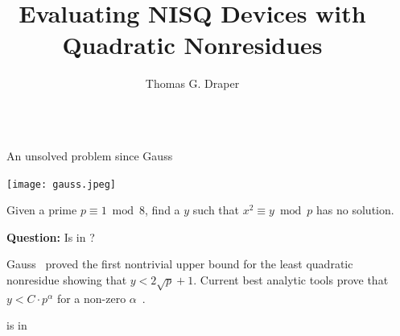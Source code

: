 \documentclass[final]{beamer}
\title{Evaluating NISQ Devices with Quadratic Nonresidues}
\author{Thomas G. Draper}
\institute[shortinst]{Center for Communications Research at La Jolla}
\providecommand{\QNR}{\csword{QNR}}
\newlength{\sepwidth}
\newlength{\colwidth}
\newcommand{\separatorcolumn}{\begin{column}{\sepwidth}\end{column}}
\begin{document}
\begin{frame}[t]

\begin{columns}[t]
\separatorcolumn

\begin{column}{\colwidth}

  \begin{block}{An unsolved problem since Gauss}
  \begin{minipage}[c]{0.3\colwidth}
    \texttt{[image: gauss.jpeg]}
  \end{minipage}
  \begin{minipage}[l]{0.7\colwidth}
    \bigskip

    Given a prime $p\equiv 1\bmod 8$, find a $y$ such that $x^2\equiv y \bmod p$ has no solution.  

    \bigskip
  {\bf Question:} Is \QNR in \xP?
    \bigskip
  \end{minipage}

Gauss~\cite{gauss} proved the first nontrivial upper bound for the least quadratic nonresidue showing that $y<2\sqrt{p}+1$.
Current best analytic tools prove that $y < C\cdot p^\alpha$ for a non-zero $\alpha$~\cite[p. 33]{1993--cohen}.
  \end{block}

  \begin{exampleblock}{\QNR is in \EQPC}


\end{exampleblock}
\end{column}
\end{columns}
\end{frame}
\end{document}
